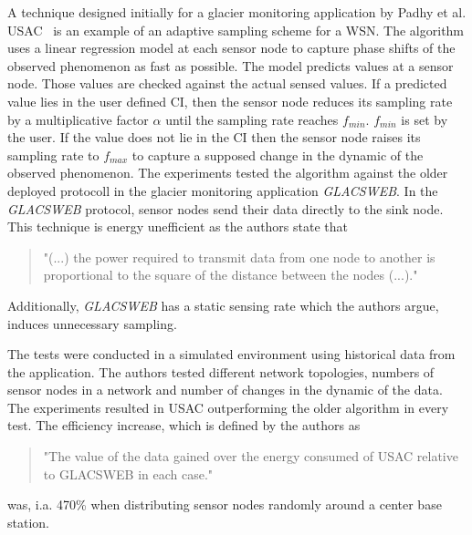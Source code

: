 A technique designed initially for a glacier monitoring application by Padhy et
al. \ac{USAC}~\cite{padhy2006utility} is an example of an adaptive sampling
scheme for a \ac{WSN}. The algorithm uses a linear regression model at each
sensor node to capture phase shifts of the observed phenomenon as fast as
possible. The model predicts values at a sensor node. Those values are checked
against the actual sensed values. If a predicted value lies in the user defined
\ac{CI}, then the sensor node reduces its sampling rate by a multiplicative
factor $ \alpha $ until the sampling rate reaches $ f_{min} $. $ f_{min} $ is
set by the user. If the value does not lie in the \ac{CI} then the sensor node
raises its sampling rate to $ f_{max} $ to capture a supposed change in the
dynamic of the observed phenomenon. The experiments tested the algorithm
against the older deployed protocoll in the glacier monitoring application
\textit{GLACSWEB}. In the \textit{GLACSWEB} protocol, sensor nodes send their
data directly to the sink node. This technique is energy unefficient as the
authors state that 

\begin{quotation}
    "(...) the power required to transmit data from one
    node to another is proportional to the square of the distance
    between the nodes (...)."
\end{quotation}

Additionally, \textit{GLACSWEB} has a static sensing rate which the authors
argue, induces unnecessary sampling.

The tests were conducted in a simulated environment using
historical data from the application. The authors tested different network
topologies, numbers of sensor nodes in a network and number of changes in the
dynamic of the data. The experiments resulted in \ac{USAC} outperforming the
older algorithm in every test. The efficiency increase, which is defined by the
authors as

\begin{quotation}
    "The value of the data gained over the energy consumed of USAC relative to
    GLACSWEB in each case."
\end{quotation}


was, i.a. 470\% when distributing sensor nodes randomly around a center base
station.
\par

